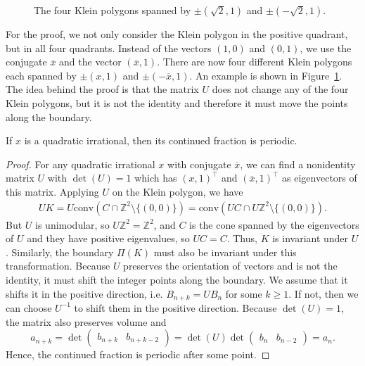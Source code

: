 \begin{figure}[tb]
  \centering
  
  \caption{
    The four Klein polygons spanned by $±(\sqrt{2}, 1)$ and $±(-\sqrt{2}, 1)$.
  }
  \label{fig:full-klein-polygon}
\end{figure}

For the proof, we not only consider the Klein polygon in the positive quadrant,
but in all four quadrants.
Instead of the vectors $(1, 0)$ and $(0, 1)$, we use the conjugate
$\overline{x}$ and the vector $(\overline{x}, 1)$.
There are now four different Klein polygons each spanned by $±(x, 1)$
and $±(-\overline{x}, 1)$.
An example is shown in Figure~\ref{fig:full-klein-polygon}.
The idea behind the proof is that the matrix $U$ does not change any of the four
Klein polygons, but it is not the identity and therefore it must move the
points along the boundary.

\begin{theorem}
  If $x$ is a quadratic irrational,
  then its continued fraction is periodic.
\end{theorem}

\begin{proof}
  For any quadratic irrational $x$ with conjugate $\overline{x}$, we can find a
  nonidentity matrix $U$ with $\det(U) = 1$ which has $(x, 1)^⊤$ and
  $(\overline{x}, 1)^⊤$ as eigenvectors of this matrix.
  Applying $U$ on the Klein polygon, we have
  \begin{align*}
    UK
    = U \mathrm{conv}(C ∩ ℤ^2 \setminus \{(0, 0)\})
    = \mathrm{conv}(UC ∩ Uℤ^2 \setminus \{(0, 0)\}).
  \end{align*}
  But $U$ is unimodular, so $Uℤ^2 = ℤ^2$, and $C$ is the cone spanned by the
  eigenvectors of $U$ and they have positive eigenvalues, so $UC = C$.
  Thus, $K$ is invariant under $U$.
  Similarly, the boundary $Π(K)$ must also be invariant under this transformation.
  Because $U$ preserves the orientation of vectors and is not the identity, it
  must shift the integer points along the boundary.
  We assume that it shifts it in the positive direction,
  i.e. $B_{n+k} = U B_n$ for some $k ≥ 1$.
  If not, then we can choose $U^{-1}$ to shift them in the positive direction.
  Because $\det(U) = 1$, the matrix also preserves volume and
  \[
    a_{n+k}
    = \det\begin{pmatrix}
      b_{n+k} & b_{n+k-2}
    \end{pmatrix}
    = \det(U) \det\begin{pmatrix}
      b_n & b_{n-2}
    \end{pmatrix}
    = a_n.
  \]
  Hence, the continued fraction is periodic after some point.
\end{proof}


